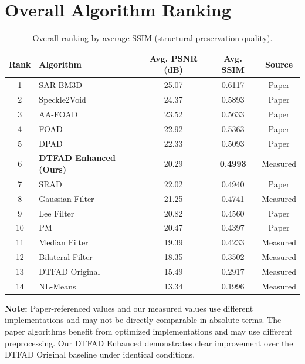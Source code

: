 \documentclass[12pt,a4paper]{article}
\begin{document}
\section{Overall Algorithm Ranking}

\begin{table}[H]
\centering
\caption{Overall ranking by average SSIM (structural preservation quality).}
\label{tab:ranking}
\begin{tabular}{clccc}
\toprule
\textbf{Rank} & \textbf{Algorithm} & \textbf{Avg. PSNR (dB)} & \textbf{Avg. SSIM} & \textbf{Source} \\
\midrule
\cellcolor{yellow!30}1 & SAR-BM3D & 25.07 & 0.6117 & Paper \\
2 & Speckle2Void & 24.37 & 0.5893 & Paper \\
3 & AA-FOAD & 23.52 & 0.5633 & Paper \\
4 & FOAD & 22.92 & 0.5363 & Paper \\
5 & DPAD & 22.33 & 0.5093 & Paper \\
\cellcolor{lightblue!40}6 & \textbf{DTFAD Enhanced (Ours)} & 20.29 & \textbf{0.4993} & Measured \\
7 & SRAD & 22.02 & 0.4940 & Paper \\
8 & Gaussian Filter & 21.25 & 0.4741 & Measured \\
9 & Lee Filter & 20.82 & 0.4560 & Paper \\
10 & PM & 20.47 & 0.4397 & Paper \\
11 & Median Filter & 19.39 & 0.4233 & Measured \\
12 & Bilateral Filter & 18.35 & 0.3502 & Measured \\
13 & DTFAD Original & 15.49 & 0.2917 & Measured \\
14 & NL-Means & 13.34 & 0.1996 & Measured \\
\bottomrule
\end{tabular}
\end{table}

\textbf{Note:} Paper-referenced values and our measured values use different implementations and may not be directly comparable in absolute terms. The paper algorithms benefit from optimized implementations and may use different preprocessing. Our DTFAD Enhanced demonstrates clear improvement over the DTFAD Original baseline under identical conditions.
\end{document}
